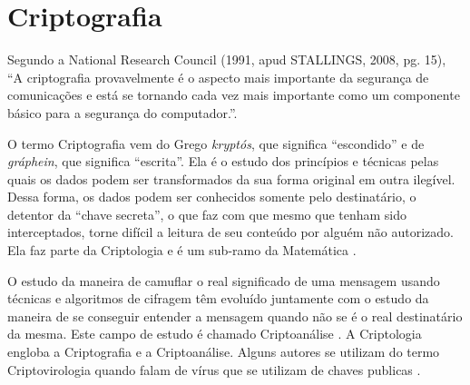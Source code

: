 

\section{Criptografia}
\label{sec:criptografia}
Segundo a National Research Council (1991, apud STALLINGS, 2008, pg. 15), “A criptografia provavelmente é o aspecto mais importante da segurança de comunicações e está se tornando cada vez mais importante como um componente básico para a segurança do computador.”.

O termo Criptografia vem do Grego \textit{kryptós}, que significa “escondido” e de \textit{gráphein}, que significa “escrita”. Ela é o estudo dos princípios e técnicas pelas quais os dados podem ser transformados da sua forma original em outra ilegível. Dessa forma, os dados podem ser conhecidos somente pelo destinatário, o detentor da “chave secreta”, o que faz com que mesmo que tenham sido interceptados, torne difícil a leitura de seu conteúdo por alguém não autorizado. Ela faz parte da Criptologia e é um sub-ramo da Matemática \cite{knudsen98}.

O estudo da maneira de camuflar o real significado de uma mensagem usando técnicas e algoritmos de cifragem têm evoluído juntamente com o estudo da maneira de se conseguir entender a mensagem quando não se é o real destinatário da mesma. Este campo de estudo é chamado Criptoanálise \cite{gaines56}. A Criptologia engloba a Criptografia e a Criptoanálise. Alguns autores se utilizam do termo Criptovirologia quando falam de vírus que se utilizam de chaves publicas \cite{young04}.

